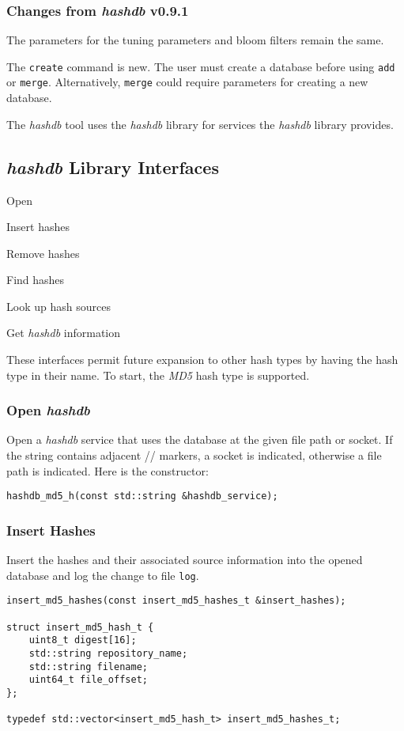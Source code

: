 \documentclass[12pt,twoside]{article}
\newcommand{\hdb}{\emph{hashdb}\xspace}
\begin{document}
\subsubsection{Changes from \hdb v0.9.1}
\begin{compactitem}
\item The parameters for the tuning parameters and bloom filters
remain the same.
\item The \texttt{create} command is new.
The user must create a database before using \texttt{add} or \texttt{merge}.
Alternatively, \texttt{merge} could require parameters for creating
a new database.
\item The \hdb tool uses the \hdb library
for services the \hdb library provides.
\end{compactitem}

\subsection{\hdb Library Interfaces}
\begin{compactitem}
\item Open
\item Insert hashes
\item Remove hashes
\item Find hashes
\item Look up hash sources
\item Get \hdb information
\end{compactitem}

These interfaces permit future expansion to other hash types
by having the hash type in their name.
To start, the \emph{MD5} hash type is supported.

\subsubsection{Open \hdb}
Open a \hdb service that uses the database at the given file path or socket.
If the string contains adjacent // markers, a socket is indicated,
otherwise a file path is indicated.
Here is the constructor:
\begin{small}
\begin{verbatim}
hashdb_md5_h(const std::string &hashdb_service);
\end{verbatim}
\end{small}

\subsubsection{Insert Hashes}
Insert the hashes and their associated source information
into the opened database and log the change to file \texttt{log}.
\begin{small}
\begin{verbatim}
insert_md5_hashes(const insert_md5_hashes_t &insert_hashes);

struct insert_md5_hash_t {
    uint8_t digest[16];
    std::string repository_name;
    std::string filename;
    uint64_t file_offset;
};

typedef std::vector<insert_md5_hash_t> insert_md5_hashes_t;
\end{verbatim}
\end{small}
\end{document}
